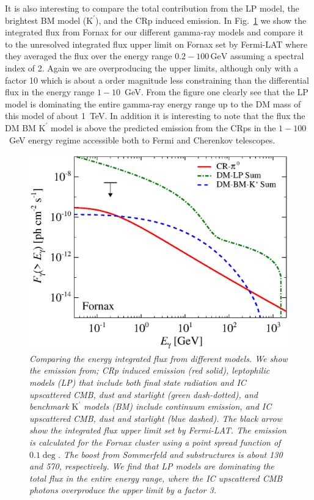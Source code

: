 \documentclass[10pt,aps,pra,reprint,amsmath,amsfonts,amssymb,showpacs]{revtex4-1}
\newcommand{\rmn}{\mathrm}
\newcommand{\Kp}{\rmn{K}^\prime}
\newcommand{\gev}{\rmn{GeV}}
\begin{document}
It is also interesting to compare the total contribution from the LP
model, the brightest BM model ($\Kp$), and the CRp induced emission. In
Fig.~\ref{fig:flux_int} we show the integrated flux from Fornax for
our different gamma-ray models and compare it to the unresolved
integrated flux upper limit on Fornax set by Fermi-LAT where they
averaged the flux over the energy range $0.2-100\,\gev$ assuming a
spectral index of 2. Again we are overproducing the upper limits,
although only with a factor 10 which is about a order magnitude less
constraining than the differential flux in the energy range
$1-10$~GeV. From the figure one clearly see that the LP model is
dominating the entire gamma-ray energy range up to the DM mass of this
model of about 1~TeV. In addition it is interesting to note that the
flux the DM BM $\Kp$ model is above the predicted emission from the
CRps in the $1-100$~GeV energy regime accessible both to Fermi and
Cherenkov telescopes.

\begin{figure}
 \includegraphics[width=0.99\columnwidth]{figures/flux.int.v11.0.1deg.1.6T.SubMass.SF300.IR2.noMW.woGal.eps}
\caption{\it Comparing the energy integrated flux from different
  models. We show the emission from; CRp induced emission (red solid),
  leptophilic models (LP) that include both final state radiation and
  IC upscattered CMB, dust and starlight (green dash-dotted), and
  benchmark $\Kp$ models (BM) include continuum emission, and IC
  upscattered CMB, dust and starlight (blue dashed). The black arrow
  show the integrated flux upper limit set by Fermi-LAT. The emission
  is calculated for the Fornax cluster using a point spread function
  of $0.1\deg$. The boost from Sommerfeld and substructures is about
  130 and 570, respectively. We find that LP models are dominating the
  total flux in the entire energy range, where the IC upscattered CMB
  photons overproduce the upper limit by a factor 3.}
 \label{fig:flux_int}
\end{figure}
\end{document}
